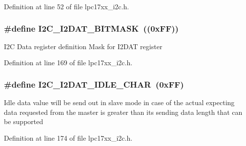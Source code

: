 \-Definition at line 52 of file lpc17xx\-\_\-i2c.\-h.

\hypertarget{group___i2_c___private___macros_gac66b7c81c93cc59f69d204b4eb7d639b}{
\subsubsection[{\-I2\-C\-\_\-\-I2\-D\-A\-T\-\_\-\-B\-I\-T\-M\-A\-S\-K}]{\setlength{\rightskip}{0pt plus 5cm}\#define {\bf \-I2\-C\-\_\-\-I2\-D\-A\-T\-\_\-\-B\-I\-T\-M\-A\-S\-K}~((0x\-F\-F))}}\label{group___i2_c___private___macros_gac66b7c81c93cc59f69d204b4eb7d639b}
\-I2\-C \-Data register definition \-Mask for \-I2\-D\-A\-T register 

\-Definition at line 169 of file lpc17xx\-\_\-i2c.\-h.

\hypertarget{group___i2_c___private___macros_ga5b04af302e0e4007df123dff0328ac5e}{
\subsubsection[{\-I2\-C\-\_\-\-I2\-D\-A\-T\-\_\-\-I\-D\-L\-E\-\_\-\-C\-H\-A\-R}]{\setlength{\rightskip}{0pt plus 5cm}\#define {\bf \-I2\-C\-\_\-\-I2\-D\-A\-T\-\_\-\-I\-D\-L\-E\-\_\-\-C\-H\-A\-R}~(0x\-F\-F)}}\label{group___i2_c___private___macros_ga5b04af302e0e4007df123dff0328ac5e}
\-Idle data value will be send out in slave mode in case of the actual expecting data requested from the master is greater than its sending data length that can be supported 

\-Definition at line 174 of file lpc17xx\-\_\-i2c.\-h.

